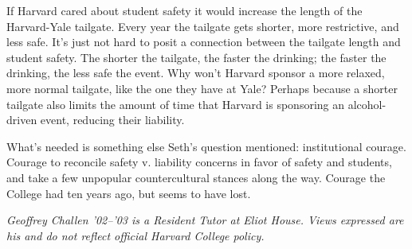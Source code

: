 If Harvard cared about student safety it would increase the length of the
Harvard-Yale tailgate. Every year the tailgate gets shorter, more
restrictive, and less safe. It's just not hard to posit a connection between
the tailgate length and student safety. The shorter the tailgate, the faster
the drinking; the faster the drinking, the less safe the event. Why won't
Harvard sponsor a more relaxed, more normal tailgate, like the one they have
at Yale? Perhaps because a shorter tailgate also limits the amount of time
that Harvard is sponsoring an alcohol-driven event, reducing their liability.

What's needed is something else Seth's question mentioned: institutional
courage. Courage to reconcile safety v. liability concerns in favor of safety
and students, and take a few unpopular countercultural stances along the way.
Courage the College had ten years ago, but seems to have lost.


\textit{Geoffrey Challen '02--'03 is a Resident Tutor at Eliot House. Views
expressed are his and do not reflect official Harvard College policy.}
